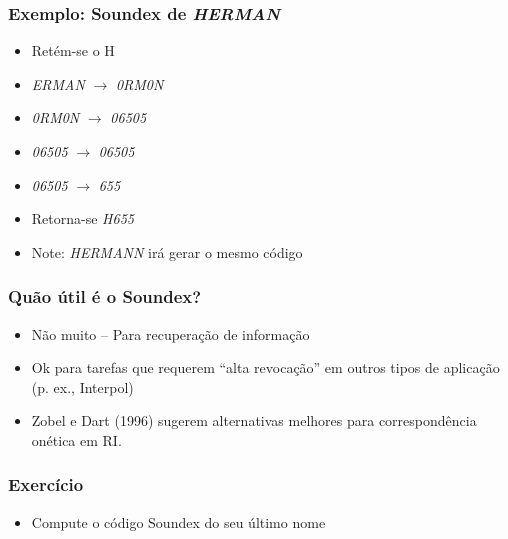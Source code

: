 \documentclass[compress]{beamer}
\begin{document}
\begin{frame}[<+->]
\frametitle{Exemplo: Soundex de \emph{HERMAN}}
\pause[2]
\begin{itemize}
\item Retém-se o H
\item \emph{ERMAN} $\rightarrow$ \emph{0RM0N}
\item \emph{0RM0N} $\rightarrow$ \emph{06505}
\item  \emph{06505} $\rightarrow$ \emph{06505}
\item \emph{06505} $\rightarrow$ \emph{655}
\item Retorna-se \emph{H655}
\item Note: \emph{HERMANN} irá gerar o mesmo código
\end{itemize}
\end{frame}

\begin{frame}[<+->]
\frametitle{Quão útil é o Soundex?}
\pause[2]
\begin{itemize}
\item Não muito -- Para recuperação de informação
\item Ok para tarefas que requerem ``alta revocação'' em outros tipos de 
aplicação  (p. ex., Interpol)
\item Zobel e Dart (1996) sugerem alternativas melhores para correspondência 
onética em RI.
\end{itemize}
\end{frame}

\begin{frame}
\frametitle{Exercício}
\begin{itemize}
\item {\color{green} Compute o código Soundex do seu último nome}
\end{itemize}
\end{frame}

\end{document}
